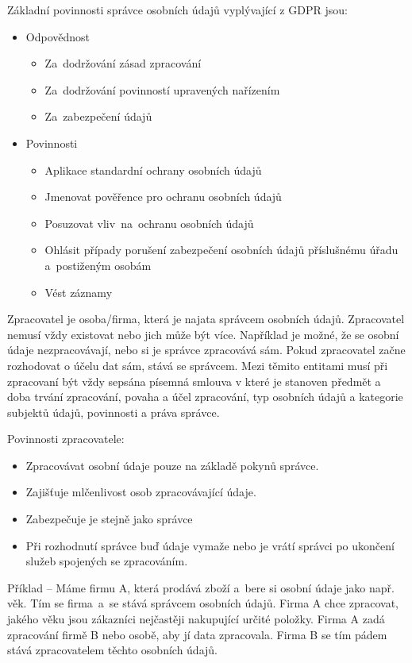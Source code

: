 Základní povinnosti správce osobních údajů vyplývající z GDPR jsou:
\begin{itemize}[noitemsep]
    \item Odpovědnost
    \begin{itemize}[noitemsep]
        \item Za~dodržování zásad zpracování
        \item Za~dodržování povinností upravených nařízením
        \item Za~zabezpečení údajů
    \end{itemize}
    \item Povinnosti
    \begin{itemize}[noitemsep]
        \item Aplikace standardní ochrany osobních údajů
        \item Jmenovat pověřence pro ochranu osobních údajů
        \item Posuzovat vliv~na~ochranu osobních údajů
        \item Ohlásit případy porušení zabezpečení osobních údajů příslušnému úřadu a~postiženým osobám
        \item Vést záznamy
    \end{itemize}
\end{itemize}

Zpracovatel je osoba/firma, která je najata správcem osobních údajů. Zpracovatel nemusí vždy existovat nebo jich může být více. Například je možné, že se osobní údaje nezpracovávají, nebo si je správce zpracovává sám. Pokud zpracovatel začne rozhodovat o účelu dat sám, stává se správcem. Mezi těmito entitami musí při zpracovaní být vždy sepsána písemná smlouva v které je stanoven předmět a doba trvání zpracování, povaha a účel zpracování, typ osobních údajů a kategorie subjektů údajů, povinnosti a práva správce.

Povinnosti zpracovatele:
\begin{itemize}[noitemsep]
    \item Zpracovávat osobní údaje pouze na základě pokynů správce.
    \item Zajišťuje mlčenlivost osob zpracovávající údaje.
    \item Zabezpečuje je stejně jako správce
    \item Při rozhodnutí správce buď údaje vymaže nebo je vrátí správci po ukončení služeb spojených se zpracováním. 
\end{itemize}

Příklad -- Máme firmu A, která prodává zboží a~bere si osobní údaje jako např. věk. Tím se firma~a~se stává správcem osobních údajů. Firma A chce zpracovat, jakého věku jsou zákazníci nejčastěji nakupující určité položky. Firma A zadá zpracování firmě B nebo osobě, aby jí data zpracovala. Firma B se tím pádem stává zpracovatelem těchto osobních údajů.

